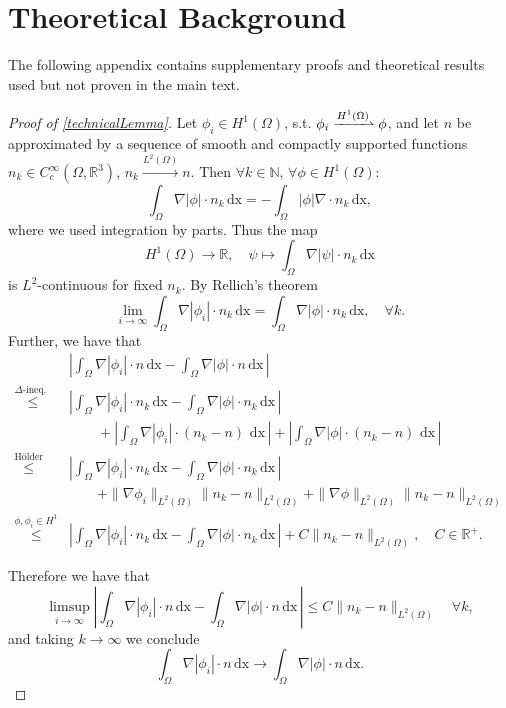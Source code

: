 \documentclass[12pt,openany]{book}
\newcommand{\R}{\mathbb{R}}
\theoremstyle{plainnormal}
\theoremstyle{remark}
\begin{document}
\chapter{Theoretical Background}
The following appendix contains supplementary proofs and theoretical results used but not proven in the main text.
\begin{proof}[Proof of \cref{technicalLemma}]
    Let $\phi_i\in H^1(\Omega)$, s.t. $\phi_i\xrightharpoonup{H^1(\Omega)} \phi$, and let $n$ be approximated by a sequence of smooth and compactly supported functions $n_k\in C_c^\infty(\Omega, \R^3)$, $n_k \xrightarrow{L^2(\Omega)} n$. Then $ \forall k\in \mathbb N, \, \forall \phi \in H^1(\Omega):$
    $$\int_\Omega \nabla |\phi|\cdot n_k \,\mathrm{dx} = - \int_\Omega |\phi| \nabla \cdot n_k \,\mathrm{dx},$$
    where we used integration by parts. Thus the map $$
    H^1(\Omega) \rightarrow\R,\quad
        \psi \mapsto \int_\Omega \nabla |\psi|\cdot n_k \,\mathrm{dx}
     $$ 
    is $L^2$-continuous for fixed $n_k$. By Rellich's theorem $$\lim_{i\rightarrow\infty}\int_\Omega \nabla |\phi_i|\cdot n_k \,\mathrm{dx} = \int_\Omega \nabla |\phi|\cdot n_k \,\mathrm{dx}, \quad \forall k.$$ Further, we have that
    \begin{align*}
        &\left|\int_\Omega \nabla |\phi_i|\cdot n \,\mathrm{dx} - \int_\Omega \nabla |\phi|\cdot n \,\mathrm{dx}\,\right|\\
       \overset{\Delta\text{-ineq.        }\,}{\leq} &\left|\int_\Omega \nabla |\phi_i|\cdot n_k \,\mathrm{dx} - \int_\Omega \nabla |\phi|\cdot n_k \,\mathrm{dx}\,\right| \\&\quad \quad + \left| \int_\Omega \nabla |\phi_i| \cdot (n_k - n) \, \,\mathrm{dx}\, \right| 
 + \left| \int_\Omega \nabla |\phi| \cdot (n_k - n) \, \,\mathrm{dx}\, \right|\\
       \overset{\text{Hölder}}{\leq} &\left|\int_\Omega \nabla |\phi_i|\cdot n_k \,\mathrm{dx} - \int_\Omega \nabla |\phi|\cdot n_k \,\mathrm{dx}\,\right| \\ &\quad \quad+ \|\nabla \phi_i\|_{L^2(\Omega)} \|n_k - n\|_{L^2(\Omega)}  + \|\nabla \phi\|_{L^2(\Omega)} \|n_k - n\|_{L^2(\Omega)}\\
       \overset{\phi, \phi_i \in H^1 }{\leq} &\left|\int_\Omega \nabla |\phi_i|\cdot n_k \,\mathrm{dx} - \int_\Omega \nabla |\phi|\cdot n_k \,\mathrm{dx}\,\right| + C\|n_k - n\|_{L^2(\Omega)},\quad C\in \R^+.
    \end{align*}
    
    Therefore we have that $$\limsup_{i\rightarrow\infty} \left| \int_\Omega \nabla |\phi_i|\cdot n \,\mathrm{dx} - \int_\Omega \nabla |\phi|\cdot n \,\mathrm{dx}\,\right| \leq C\|n_k - n\|_{L^2(\Omega)}\quad \forall k,$$ and taking $k\rightarrow\infty$ we conclude $$\int_\Omega \nabla |\phi_i|\cdot n \,\mathrm{dx} \rightarrow\int_\Omega \nabla |\phi|\cdot n \,\mathrm{dx}.$$
\end{proof}
\end{document}
